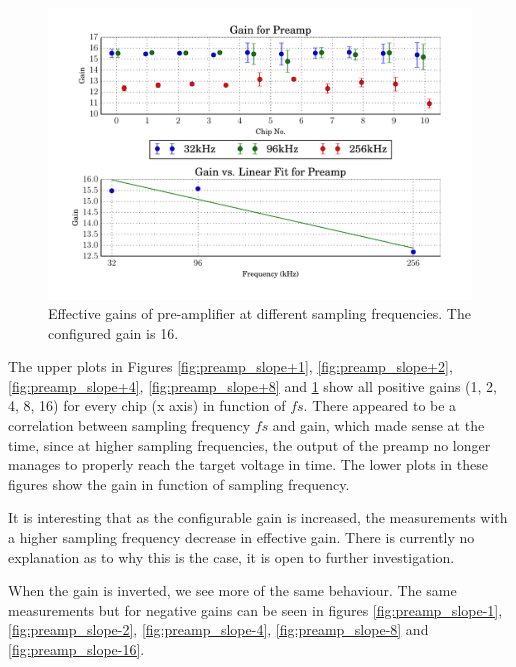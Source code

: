 \begin{figure}
    \centering
    \includegraphics[width=0.95\linewidth]{images/plots/dc_slope_preamp_gain+16.pdf}
    \caption{Effective gains of pre-amplifier at different sampling frequencies. The configured gain is 16.}
    \label{fig:preamp_slope+16}
\end{figure}

The      upper      plots       in      Figures      \ref{fig:preamp_slope+1},
\ref{fig:preamp_slope+2},  \ref{fig:preamp_slope+4},  \ref{fig:preamp_slope+8}
and \ref{fig:preamp_slope+16}  show all positive  gains (1,  2, 4, 8,  16) for
every chip  (x axis) in function  of $fs$. There appeared to  be a correlation
between sampling frequency $fs$ and gain,  which made sense at the time, since
at higher sampling frequencies, the output  of the preamp no longer manages to
properly reach  the target voltage in  time. The lower plots in  these figures
show the gain in function of sampling frequency.

\newpage
It is interesting that as the configurable gain is increased, the measurements
with  a  higher  sampling frequency  decrease  in  effective  gain.  There  is
currently  no  explanation as to why this is the case, it is open  to  further
investigation.

When  the  gain  is  inverted,  we see more of the same  behaviour.  The  same
measurements    but    for   negative   gains   can   be   seen   in   figures
\ref{fig:preamp_slope-1},  \ref{fig:preamp_slope-2}, \ref{fig:preamp_slope-4},
\ref{fig:preamp_slope-8} and \ref{fig:preamp_slope-16}.

